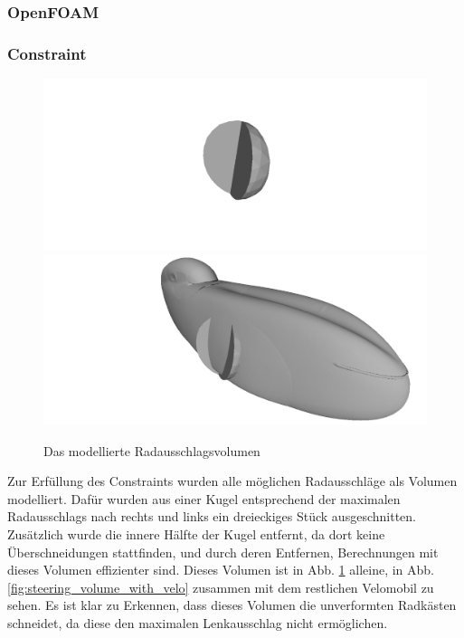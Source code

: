 \subsubsection{OpenFOAM}


\subsubsection{Constraint}
\begin{figure}[h]
	\includegraphics[width=.5\linewidth]{bilder/radausschlag.png}
	\includegraphics[width=.5\linewidth]{bilder/radausschlag_inclVelo.png}
	\caption{Das modellierte Radausschlagsvolumen}
	\label{fig:steering_volume}
\end{figure}
Zur Erfüllung des Constraints wurden alle möglichen Radausschläge als Volumen modelliert.
Dafür wurden aus einer Kugel entsprechend der maximalen Radausschlags nach rechts und links ein dreieckiges Stück ausgeschnitten.
Zusätzlich wurde die innere Hälfte der Kugel entfernt, da dort keine Überschneidungen stattfinden, und durch deren Entfernen, Berechnungen mit dieses Volumen effizienter sind.
Dieses Volumen ist in Abb. \ref{fig:steering_volume} alleine, in Abb. \ref{fig:steering_volume_with_velo} zusammen mit dem restlichen Velomobil zu sehen.
Es ist klar zu Erkennen, dass dieses Volumen die unverformten Radkästen schneidet, da diese den maximalen Lenkausschlag nicht ermöglichen.
 

